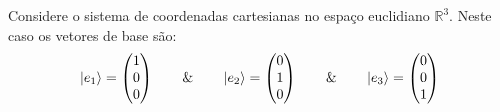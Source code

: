 \begin{example}\label{exemple 1.3}
    Considere o sistema de coordenadas cartesianas no espaço euclidiano $\mathbb{R}^3$. Neste caso os vetores de base são:
        \begin{equation*}
            \ket{e_{1}} = 
            \begin{pmatrix}
                1 \\
                0 \\
                0
            \end{pmatrix} \qquad \& \qquad 
            \ket{e_{2}} = 
            \begin{pmatrix}
                0 \\
                1 \\
                0
            \end{pmatrix} \qquad \& \qquad 
            \ket{e_{3}} = 
            \begin{pmatrix}
                0 \\
                0 \\
                1
            \end{pmatrix}
        \end{equation*}
        

\end{example}
